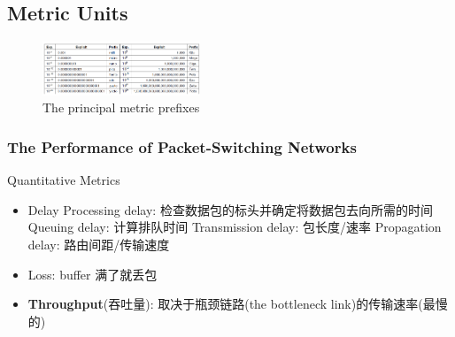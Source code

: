 \subsection{Metric Units} 
\begin{figure}[!htb]
    \centering
    \includegraphics[width=0.42\textwidth]{pic/CN1/Metric prefixes.png}
    \caption{The principal metric prefixes}
\end{figure}

\subsubsection{The Performance of Packet-Switching Networks}
Quantitative Metrics
\begin{itemize}
    \item Delay
    \subitem Processing delay: 检查数据包的标头并确定将数据包去向所需的时间
    \subitem Queuing delay: 计算排队时间
    \subitem Transmission delay: 包长度/速率
    \subitem Propagation delay: 路由间距/传输速度
    \item Loss: buffer 满了就丢包
    \item \textbf{Throughput}(吞吐量): 取决于瓶颈链路(the bottleneck link)的传输速率(最慢的)
\end{itemize}


